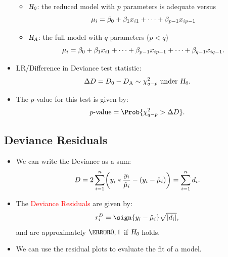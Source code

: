 \documentclass{article}\usepackage[]{graphicx}\usepackage[svgnames]{xcolor}
\let\log\relax%
\newcommand{\HN}{\textsl{H}_{\textsl{0}}}%
\newcommand{\HA}{\textsl{H}_{\textsl{A}}}%
\DeclarePairedDelimiter\abs{\lvert}{\rvert}
\begin{document}
\begin{itemize}
            \begin{itemize}
                  \item $ \HN $: the reduced model with $ p $ parameters is adequate versus
                        \[ \log{\mu_i}=\beta_0+\beta_1x_{i1}+\cdots+\beta_{p-1}x_{ip-1} \]
                  \item $ \HA $: the full model with $ q $ parameters ($ p<q $)
                        \[ \log{\mu_i}=\beta_0+\beta_1x_{i1}+\cdots+\beta_{p-1}x_{ip-1}+\cdots+\beta_{q-1}x_{iq-1}. \]
            \end{itemize}
      \item LR/Difference in Deviance test statistic:
            \[ \Delta D=D_0-D_\text{A} \sim \chi^2_{q-p}\text{ under $ \HN $}. \]
      \item The $ p $-value for this test is given by:
            \[ p\text{-value}=\Prob{\chi^2_{q-p}>\Delta D}. \]
\end{itemize}
\subsection*{Deviance Residuals}
\begin{itemize}
      \item We can write the Deviance as a sum:
            \[ D=2 \sum_{i=1}^{n} \biggl(y_i\log*{\frac{y_i}{\hat{\mu}_i}}-(y_i-\hat{\mu}_i)\biggr)=\sum_{i=1}^{n} d_i. \]
      \item The \textcolor{Red}{Deviance Residuals} are given by:
            \[ r_i^D=\sign{y_i-\hat{\mu}_i}\sqrt{\abs{d_i}}, \]
            and are approximately $ \N{0,1} $ if $ \HN $ holds.
      \item We can use the residual plots to evaluate the fit of a model.
\end{itemize}
\end{document}
